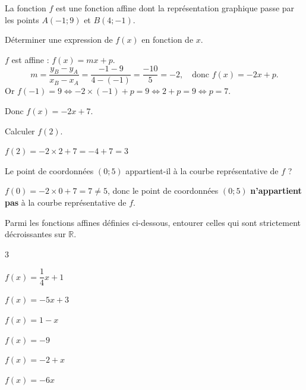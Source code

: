 \documentclass[12pt,a4paper]{book}
\begin{document}
\exerciceDS{}

La fonction $f$ est une fonction affine dont la représentation graphique passe par les points $A(-1 ; 9)$ et $B(4 ;-1)$.
\begin{enumMet}
	\item Déterminer une expression de $f(x)$ en fonction de $x$.

	\begin{corrBox}
		$f$ est affine : $f(x)=mx+p$.
		\[m=\frac{y_B-y_A}{x_B-x_A}=\frac{-1-9}{4-(-1)}=\frac{-10}{5}=-2, \quad\text{donc } f(x)=-2x+p.\]
		Or $f(-1)=9 \iff -2\times(-1)+p=9 \iff 2+p=9 \iff p=7$.

		Donc $f(x)=-2x+7$.
	\end{corrBox}
	\item Calculer $f(2)$.

	\begin{corrBox}
		$f(2)=-2\times 2+7=-4+7=3$
	\end{corrBox}
	\item Le point de coordonnées $(0 ; 5)$ appartient-il à la courbe représentative de $f$ ?

	\begin{corrBox}
		$f(0)=-2\times 0+7=7\neq 5$, donc le point de coordonnées $(0;5)$ \textbf{n'appartient pas} à la courbe représentative de $f$.
	\end{corrBox}
\end{enumMet}

\exerciceDS{}

Parmi les fonctions affines définies ci-dessous, entourer celles qui sont strictement décroissantes sur $\mathbb{R}$.
\begin{multicols}{3}
\begin{enumMet}
	\item $f(x)=\dfrac{1}{4} x+1$
	\item $f(x)=-5 x+3$
	\item $f(x)=1-x$
	\item $f(x)=-9$
	\item $f(x)=-2+x$
	\item $f(x)=-6 x$
\end{enumMet}
\end{multicols}
\end{document}
